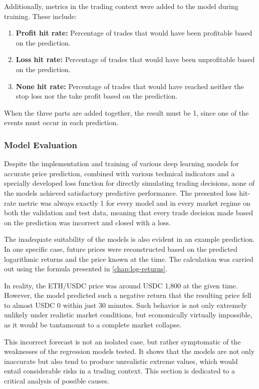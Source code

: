 Additionally, metrics in the trading context were added to the model during training.
These include:

\begin{enumerate}
    \item \textbf{Profit hit rate:} Percentage of trades that would have been profitable based on the prediction.
    \item \textbf{Loss hit rate:} Percentage of trades that would have been unprofitable based on the prediction.
    \item \textbf{None hit rate:} Percentage of trades that would have reached neither the stop loss nor the take profit based on the prediction.
\end{enumerate}

\noindent
When the three parts are added together, the result must be 1, since one of the events must occur in each prediction.

\subsubsection{Model Evaluation}
\label{chap:regression-models-evaluation}

Despite the implementation and training of various deep learning models for accurate price prediction, combined with various technical indicators and a specially developed loss function for directly simulating trading decisions, none of the models achieved satisfactory predictive performance.
The presented loss hit-rate metric was always exactly 1 for every model and in every market regime on both the validation and test data, meaning that every trade decision made based on the prediction was incorrect and closed with a loss.

The inadequate suitability of the models is also evident in an example prediction.
In one specific case, future prices were reconstructed based on the predicted logarithmic returns and the price known at the time.
The calculation was carried out using the formula presented in \autoref{chap:log-returns}.

In reality, the ETH/USDC price was around USDC 1,800 at the given time.
However, the model predicted such a negative return that the resulting price fell to almost USDC 0 within just 30 minutes.
Such behavior is not only extremely unlikely under realistic market conditions, but economically virtually impossible, as it would be tantamount to a complete market collapse.

This incorrect forecast is not an isolated case, but rather symptomatic of the weaknesses of the regression models tested.
It shows that the models are not only inaccurate but also tend to produce unrealistic extreme values, which would entail considerable risks in a trading context.
This section is dedicated to a critical analysis of possible causes.

